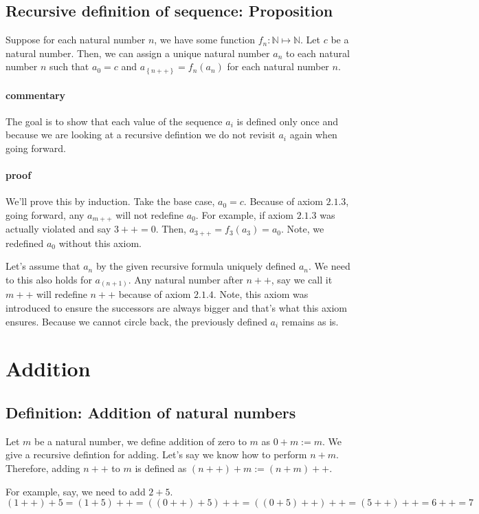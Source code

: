 \documentclass{report}
\begin{document}
\subsection{Recursive definition of sequence: Proposition} Suppose for each natural number $n$, we have some function $f_n: \mathbb{N} \mapsto \mathbb{N}$. Let $c$ be a natural number. Then, we can assign a unique natural number $a_n$ to each natural number $n$ such that $a_0 = c$ and $a_\left\{ n++ \right\} = f_n\left( a_n \right) $ for each natural number $n$.
\paragraph{commentary} The goal is to show that each value of the sequence $a_i$ is defined only once and because we are looking at a recursive defintion we do not revisit $a_i$ again when going forward. 
\paragraph{proof} We'll prove this by induction. Take the base case, $a_0 = c$. Because of axiom $2.1.3$, going forward, any $a_{m++} $ will not redefine $a_0$. For example, if axiom $2.1.3$ was actually violated and say $3++ = 0$. Then, $a_{3++} = f_3\left( a_3 \right) = a_0$. Note, we redefined $a_0$ without this axiom.

Let's assume that $a_n$ by the given recursive formula uniquely defined $a_n$. We need to this also holds for $a_\left( n+1 \right) $. Any natural number after $n++$, say we call it $m++ $ will redefine $n++$ because of axiom $2.1.4$. Note, this axiom was introduced to ensure the successors are always bigger and that's what this axiom ensures. Because we cannot circle back, the previously defined $a_i$ remains as is.

\section{Addition}
\subsection{Definition: Addition of natural numbers}
Let $m$ be a natural number, we define addition of zero to $m$ as $0 + m := m$. We give a recursive defintion for adding. Let's say we know how to perform $n + m$. Therefore, adding  $n++$ to $m$ is defined as $\left( n++ \right) +m := \left( n+m \right) ++$.

For example, say, we need to add $2 + 5$.  $\left( 1++ \right) +5 = \left( 1 + 5 \right) ++ = \left( \left( 0++ \right) +5 \right) ++ = \left( \left( 0 + 5 \right) ++ \right) ++ = \left( 5++ \right) ++ = 6++ = 7 $
\end{document}
